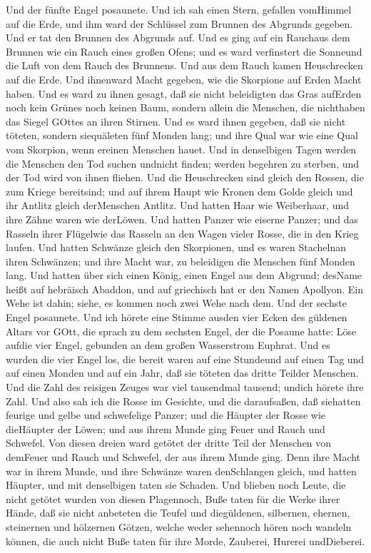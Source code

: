  Und der fünfte Engel posaunete. Und ich sah einen Stern,
gefallen vomHimmel auf die Erde, und ihm ward der Schlüssel zum Brunnen
des Abgrunds gegeben.  Und er tat den Brunnen des Abgrunds
auf. Und es ging auf ein Rauchaus dem Brunnen wie ein Rauch eines großen
Ofens; und es ward verfinstert die Sonneund die Luft von dem Rauch des
Brunnens.  Und aus dem Rauch kamen Heuschrecken auf die
Erde. Und ihnenward Macht gegeben, wie die Skorpione auf Erden Macht
haben.  Und es ward zu ihnen gesagt, daß sie nicht
beleidigten das Gras aufErden noch kein Grünes noch keinen Baum, sondern
allein die Menschen, die nichthaben das Siegel GOttes an ihren Stirnen.
 Und es ward ihnen gegeben, daß sie nicht töteten, sondern
siequäleten fünf Monden lang; und ihre Qual war wie eine Qual vom
Skorpion, wenn ereinen Menschen hauet.  Und in denselbigen
Tagen werden die Menschen den Tod suchen undnicht finden; werden
begehren zu sterben, und der Tod wird von ihnen fliehen. 
Und die Heuschrecken sind gleich den Rossen, die zum Kriege bereitsind;
und auf ihrem Haupt wie Kronen dem Golde gleich und ihr Antlitz gleich
derMenschen Antlitz.  Und hatten Haar wie Weiberhaar, und
ihre Zähne waren wie derLöwen.  Und hatten Panzer wie
eiserne Panzer; und das Rasseln ihrer Flügelwie das Rasseln an den Wagen
vieler Rosse, die in den Krieg laufen.  Und hatten Schwänze
gleich den Skorpionen, und es waren Stachelnan ihren Schwänzen; und ihre
Macht war, zu beleidigen die Menschen fünf Monden lang. 
Und hatten über sich einen König, einen Engel aus dem Abgrund; desName
heißt auf hebräisch Abaddon, und auf griechisch hat er den Namen
Apollyon.  Ein Wehe ist dahin; siehe, es kommen noch zwei
Wehe nach dem.  Und der sechste Engel posaunete. Und ich
hörete eine Stimme ausden vier Ecken des güldenen Altars vor GOtt,
 die sprach zu dem sechsten Engel, der die Posaune hatte:
Löse aufdie vier Engel, gebunden an dem großen Wasserstrom Euphrat.
 Und es wurden die vier Engel los, die bereit waren auf
eine Stundeund auf einen Tag und auf einen Monden und auf ein Jahr, daß
sie töteten das dritte Teilder Menschen.  Und die Zahl des
reisigen Zeuges war viel tausendmal tausend; undich hörete ihre Zahl.
 Und also sah ich die Rosse im Gesichte, und die
daraufsaßen, daß siehatten feurige und gelbe und schwefelige Panzer; und
die Häupter der Rosse wie dieHäupter der Löwen; und aus ihrem Munde ging
Feuer und Rauch und Schwefel.  Von diesen dreien ward
getötet der dritte Teil der Menschen von demFeuer und Rauch und
Schwefel, der aus ihrem Munde ging.  Denn ihre Macht war in
ihrem Munde, und ihre Schwänze waren denSchlangen gleich, und hatten
Häupter, und mit denselbigen taten sie Schaden.  Und
blieben noch Leute, die nicht getötet wurden von diesen Plagennoch, Buße
taten für die Werke ihrer Hände, daß sie nicht anbeteten die Teufel und
diegüldenen, silbernen, ehernen, steinernen und hölzernen Götzen, welche
weder sehennoch hören noch wandeln können,  die auch nicht
Buße taten für ihre Morde, Zauberei, Hurerei undDieberei.


